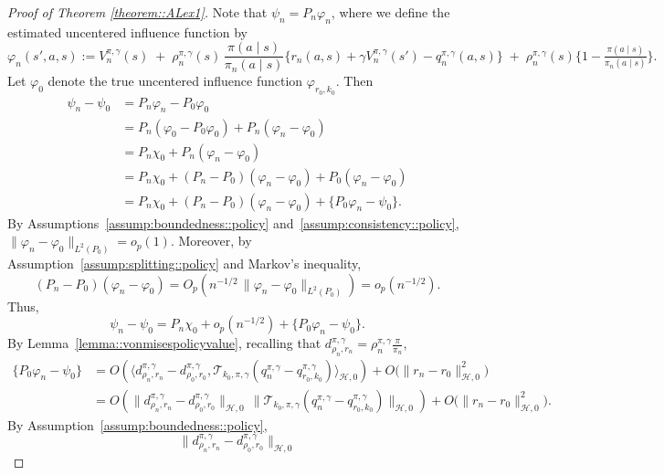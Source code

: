 \documentclass[11pt]{article}
\theoremstyle{plain}
\begin{document}
 
\begin{proof}[Proof of Theorem \ref{theorem::ALex1}]
Note that $\psi_n = P_n \varphi_n$, where we define the estimated uncentered influence function by
\[
\varphi_n(s', a, s)
:= V_n^{\pi, \gamma}(s)  
\;+\; \rho_n^{\pi,\gamma}(s)\,\frac{\pi(a \mid s)}{\pi_n(a \mid s)}
    \big\{r_n(a, s) + \gamma V_n^{\pi, \gamma}(s') - q_n^{\pi,\gamma}(a, s)\big\}
\;+\; \rho_n^{\pi,\gamma}(s)\Big\{1 - \tfrac{\pi(a \mid s)}{\pi_n(a \mid s)}\Big\}.
\]
Let $\varphi_0$ denote the true uncentered influence function $\varphi_{r_0, k_0}$. Then
\begin{align*}
    \psi_n - \psi_0
    &= P_n \varphi_n - P_0 \varphi_0 \\
    &= P_n(\varphi_0 - P_0 \varphi_0) + P_n(\varphi_n - \varphi_0) \\
    &= P_n \chi_0 + P_n(\varphi_n - \varphi_0) \\
    &= P_n \chi_0 + (P_n - P_0)(\varphi_n - \varphi_0) + P_0(\varphi_n - \varphi_0) \\
    &= P_n \chi_0 + (P_n - P_0)(\varphi_n - \varphi_0) + \{P_0 \varphi_n - \psi_0\}.
\end{align*}
By Assumptions~\ref{assump:boundedness::policy} and~\ref{assump:consistency::policy},  
$\|\varphi_n - \varphi_0\|_{L^2(P_0)} = o_p(1)$. Moreover, by
Assumption~\ref{assump:splitting::policy} and Markov’s inequality,
\[
(P_n - P_0)(\varphi_n - \varphi_0)
= O_p\!\left(n^{-1/2}\,\|\varphi_n - \varphi_0\|_{L^2(P_0)}\right)
= o_p(n^{-1/2}).
\]
Thus,
\[
\psi_n - \psi_0
= P_n \chi_0 + o_p(n^{-1/2}) + \{P_0 \varphi_n - \psi_0\}.
\]
By Lemma~\ref{lemma::vonmisespolicyvalue}, recalling that  
$d_{\rho_n, r_n}^{\pi,\gamma} = \rho_n^{\pi,\gamma}\tfrac{\pi}{\pi_n}$,
\begin{align*}
   \{P_0 \varphi_n - \psi_0\}
   &= O\!\left(
       \big\langle
          d_{\rho_n, r_n}^{\pi,\gamma} - d_{\rho_0, r_0}^{\pi,\gamma},
          \mathcal{T}_{k_0,\pi,\gamma}(q_n^{\pi,\gamma} - q_{r_0, k_0}^{\pi,\gamma})
       \big\rangle_{\mathcal{H}, 0}
     \right)
     + O\bigl(\|r_n - r_0\|_{\mathcal{H}, 0}^2\bigr) \\
   &= O\!\left(
       \|d_{\rho_n, r_n}^{\pi,\gamma} - d_{\rho_0, r_0}^{\pi,\gamma}\|_{\mathcal{H}, 0}\,
       \|\mathcal{T}_{k_0,\pi,\gamma}(q_n^{\pi,\gamma} - q_{r_0, k_0}^{\pi,\gamma})\|_{\mathcal{H}, 0}
     \right)
     + O\bigl(\|r_n - r_0\|_{\mathcal{H}, 0}^2\bigr).
\end{align*}
By Assumption~\ref{assump:boundedness::policy},
\[
\|d_{\rho_n, r_n}^{\pi,\gamma} - d_{\rho_0, r_0}^{\pi,\gamma}\|_{\mathcal{H}, 0}
\]
\end{proof}
\end{document}
